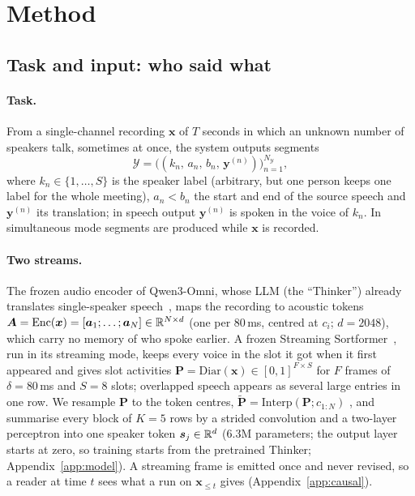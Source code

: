 \section{Method}
\label{sec:method}



\subsection{Task and input: who said what}
\label{sec:method-task}
\label{sec:method-audio}
\label{sec:method-spk}
\label{sec:method-fuse}

\paragraph{Task.} From a single-channel recording $\bm{x}$ of $T$ seconds in which an unknown number of speakers talk,
sometimes at once, the system outputs segments
\begin{equation}
\mathcal{Y}=\big((k_n,\,a_n,\,b_n,\,\bm{y}^{(n)})\big)_{n=1}^{N_\mathcal{Y}},
\label{eq:task}
\end{equation}
where $k_n\in\{1,\dots,S\}$ is the speaker label (arbitrary, but one person keeps one label for the whole meeting),
$a_n<b_n$ the start and end of the source speech and $\bm{y}^{(n)}$ its translation; in speech output $\bm{y}^{(n)}$ is
spoken in the voice of $k_n$. In simultaneous mode segments are produced while $\bm{x}$ is recorded.

\paragraph{Two streams.} The frozen audio encoder of Qwen3-Omni, whose LLM (the ``Thinker'') already translates
single-speaker speech~\citep{xu2025qwen3omni}, maps the recording to acoustic tokens
$\bm{A}=\mathrm{Enc}(\bm{x})=[\bm{a}_1;\dots;\bm{a}_N]\in\mathbb{R}^{N\times d}$ (one per 80\,ms, centred at $c_i$; $d=2048$), which carry no memory of who spoke earlier. A frozen Streaming Sortformer~\citep{medennikov2025streaming}, run in its
streaming mode, keeps every voice in the slot it got when it first appeared and gives slot activities
$\bm{P}=\mathrm{Diar}(\bm{x})\in[0,1]^{F\times S}$  for $F$ frames
of $\delta=80$\,ms and $S=8$ slots; overlapped speech appears as several large entries in one row. We resample $\bm{P}$
to the token centres, $\tilde{\bm{P}}=\mathrm{Interp}(\bm{P};c_{1:N})$ , and summarise every block of $K=5$ rows by a strided
convolution and a two-layer perceptron into one speaker token $\bm{s}_j\in\mathbb{R}^{d}$ (6.3M parameters; the output layer starts at zero, so training
starts from the pretrained Thinker; Appendix~\ref{app:model}). A streaming frame is emitted once and never revised, so a
reader at time $t$ sees what a run on $\bm{x}_{\le t}$ gives (Appendix~\ref{app:causal}).

